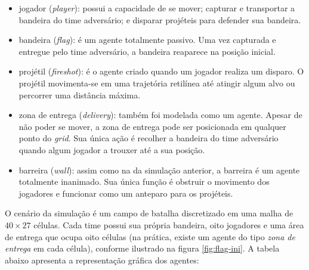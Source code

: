 \documentclass[preprint,12pt]{elsarticle}
\begin{document}
\begin{itemize}
	\setlength\itemsep{0pt}
	\item jogador (\textit{player}): possui a capacidade de se mover; capturar e transportar a bandeira do time adversário; e disparar projéteis para defender sua bandeira.
	\item bandeira (\textit{flag}): é um agente totalmente passivo. Uma vez capturada e entregue pelo time adversário, a bandeira reaparece na posição inicial.
	\item projétil (\textit{fireshot}): é o agente criado quando um jogador realiza um disparo. O projétil movimenta-se em uma trajetória retilínea até atingir algum alvo ou percorrer uma distância máxima. 
	\item zona de entrega (\textit{delivery}): também foi modelada como um agente. Apesar de não poder se mover, a zona de entrega pode ser posicionada em qualquer ponto do \textit{grid}. Sua única ação é recolher a bandeira do time adversário quando algum jogador a trouxer até a sua posição.
	\item barreira (\textit{wall}): assim como na da simulação anterior, a barreira é um agente totalmente inanimado. Sua única função é obstruir o movimento dos jogadores e funcionar como um anteparo para os projéteis.
\end{itemize}

O cenário da simulação é um campo de batalha discretizado em uma malha de $40 \times 27$ células. Cada time possui sua própria bandeira, oito jogadores e uma área de entrega que ocupa oito células (na prática, existe um agente do tipo \textit{zona de entrega} em cada célula), conforme ilustrado na figura \ref{fig:flag-ini}. A tabela abaixo apresenta a representação gráfica dos agentes:
\end{document}
